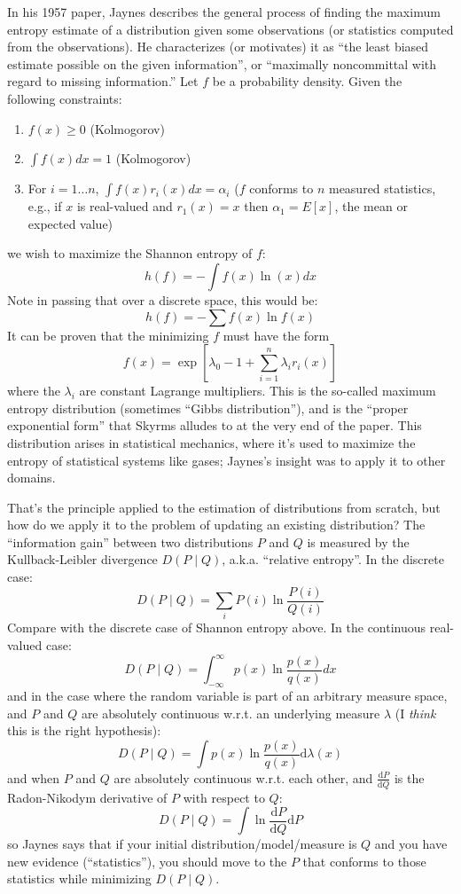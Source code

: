 \documentclass[letterpaper,12pt]{article}
\begin{document}
In his 1957 paper, Jaynes describes the general process of finding the maximum entropy estimate of a distribution given some observations (or statistics computed from the observations). He characterizes (or motivates) it as ``the least biased estimate possible on the given information'', or ``maximally noncommittal with regard to missing information.'' Let $f$ be a probability density. Given the following constraints:
\begin{enumerate}
\item
$f(x) \geq 0$ (Kolmogorov)
\item
$\int f(x) dx = 1$ (Kolmogorov)
\item
For $i = 1 \ldots n$, $\int f(x) r_i(x) dx = \alpha_i$ ($f$ conforms to $n$ measured statistics, e.g., if $x$ is real-valued and $r_1(x) = x$ then $\alpha_1 = E[x]$, the mean or expected value)
\end{enumerate}
we wish to maximize the Shannon entropy of $f$:
$$h(f) = - \int f(x) \ln (x) dx$$
Note in passing that over a discrete space, this would be:
$$h(f) = - \sum f(x) \ln f(x)$$
It can be proven that the minimizing $f$ must have the form
$$f(x) = \exp [\lambda_0 - 1 + \sum_{i=1}^n \lambda_i r_i(x)]$$
where the $\lambda_i$ are constant Lagrange multipliers. This is the so-called maximum entropy distribution (sometimes ``Gibbs distribution''), and is the ``proper exponential form'' that Skyrms alludes to at the very end of the paper. This distribution arises in statistical mechanics, where it's used to maximize the entropy of statistical systems like gases; Jaynes's insight was to apply it to other domains.

That's the principle applied to the estimation of distributions from scratch, but how do we apply it to the problem of updating an existing distribution? The ``information gain'' between two distributions $P$ and $Q$ is measured by the Kullback-Leibler divergence $D(P \mid Q)$, a.k.a. ``relative entropy''. In the discrete case:
$$D(P\mid Q) = \sum_i P(i) \ln \frac{P(i)}{Q(i)}$$
Compare with the discrete case of Shannon entropy above. In the continuous real-valued case:
$$D(P\mid Q) = \int_{-\infty}^\infty p(x) \ln \frac{p(x)}{q(x)} dx$$
and in the case where the random variable is part of an arbitrary measure space, and $P$ and $Q$ are absolutely continuous w.r.t. an underlying measure $\lambda$ (I \emph{think} this is the right hypothesis):
$$D(P\mid Q) = \int p(x) \ln \frac{p(x)}{q(x)} \mathrm{d}\lambda(x)$$
and when $P$ and $Q$ are absolutely continuous w.r.t. each other, and $\frac{\mathrm{d}P}{\mathrm{d}Q}$ is the Radon-Nikodym derivative of $P$ with respect to $Q$:
$$D(P \mid Q) = \int \ln \frac{\mathrm{d}P}{\mathrm{d}Q} \mathrm{d}P$$
so Jaynes says that if your initial distribution/model/measure is $Q$ and you have new evidence (``statistics''), you should move to the $P$ that conforms to those statistics while minimizing $D(P\mid Q)$. 
\end{document}
